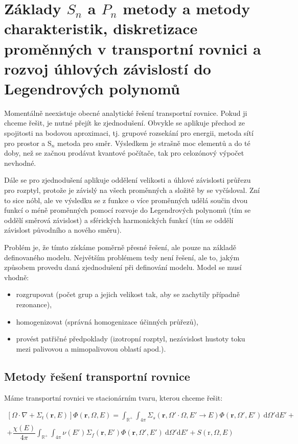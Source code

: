 \section[$S_n$ a $P_n$ metody]{Základy $S_n$ a $P_n$ metody a metody charakteristik, diskretizace proměnných v transportní rovnici a rozvoj úhlových závislostí do Legendrových polynomů}

Momentálně neexistuje obecné analytické řešení transportní rovnice. Pokud ji chceme řešit, je nutné přejít ke zjednodušení. Obvykle se aplikuje přechod ze spojitosti na bodovou aproximaci, tj. grupové rozsekání pro energii, metoda sítí pro prostor a S$_n$ metoda pro směr. Výsledkem je strašně moc elementů a do té doby, než se začnou prodávat kvantové počítače, tak pro celozónový výpočet nevhodné.

Dále se pro zjednodušení aplikuje oddělení velikosti a úhlové závislosti průřezu pro rozptyl, protože je závislý na všech proměnných a složitě by se vyčísloval. Zní to sice nóbl, ale ve výsledku se z funkce o více proměnných udělá součin dvou funkcí o méně proměnných pomocí rozvoje do Legendrových polynomů  (tím se oddělí směrová závislost) a sférických harmonických funkcí (tím se oddělí závislost původního a nového směru). 

Problém je, že tímto získáme poměrně přesné řešení, ale pouze na základě definovaného modelu. Největším problémem tedy není řešení, ale to, jakým způsobem provedu daná zjednodušení při definování modelu. Model se musí vhodně:

\begin{itemize}
  \item rozgrupovat (počet grup a jejich velikost tak, aby se zachytily případně rezonance),
  \item homogenizovat (správná homogenizace účinných průřezů),
  \item provést patřičné předpoklady (izotropní rozptyl, nezávislost hustoty toku mezi palivovou a mimopalivovou oblastí apod.).
\end{itemize}

\subsection{Metody řešení transportní rovnice}

Máme transportní rovnici ve stacionárním tvaru, kterou chceme řešit:

\begin{equation*}
  \boxed{
  \begin{multlined}
    \left[ \Omega \cdot \nabla + \Sigma_t(\textbf{r},E) \right] \Phi(\textbf{r}, \Omega, E) = \int_\mathbb{R^+} \int_{4\pi} \Sigma_s(\textbf{r}, \Omega' \cdot \Omega, E' \rightarrow E) \Phi(\textbf{r}, \Omega', E') \: \text{d}\Omega' \text{d}E' + \\
    + \dfrac{\chi(E)}{4\pi} \int_\mathbb{R^+} \int_{4\pi} \nu(E') \Sigma_f(\textbf{r}, E') \Phi(\textbf{r}, \Omega', E') \: \text{d}\Omega' \text{d}E' + S(\text{r},\Omega,E)
  \end{multlined}}
\end{equation*}

